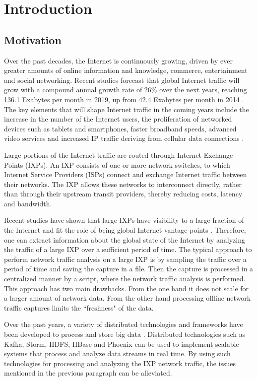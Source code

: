 \chapter{Introduction}\label{chapter:introduction}

\section{Motivation}

Over the past decades, the Internet is continuously growing, driven by ever greater amounts of online information and knowledge, commerce, entertainment and social networking. Recent studies forecast that global Internet traffic will grow with a compound annual growth rate of 26\% over the next years, reaching 136.1 Exabytes per month in 2019, up from 42.4 Exabytes per month in 2014 \cite{cisco_2014}. The key elements that will shape Internet traffic in the coming years include the increase in the number of the Internet users, the proliferation of networked devices such as tablets and smartphones, faster broadband speeds, advanced video services and increased IP traffic deriving from cellular data connections \cite{cisco_press}.

Large portions of the Internet traffic are routed through Internet Exchange Points (IXPs). An IXP consists of one or more network switches, to which Internet Service Providers (ISPs) connect and exchange Internet traffic between their networks. The IXP allows these networks to interconnect directly, rather than through their upstream transit providers, thereby reducing costs, latency and bandwidth. 

Recent studies have shown that large IXPs have visibility to a large fraction of the Internet and fit the role of being global Internet vantage points \cite{smaragdakis}. Therefore, one can extract information about the global state of the Internet by analyzing the traffic of a large IXP over a sufficient period of time. The typical approach to perform network traffic analysis on a large IXP is by sampling the traffic over a period of time and saving the capture in a file. Then the capture is processed in a centralized manner by a script, where the network traffic analysis is performed. This approach has two main drawbacks. From the one hand it does not scale for a larger amount of network data. From the other hand processing offline network traffic captures limits the ``freshness" of the data.

Over the past years, a variety of distributed technologies and frameworks have been developed to process and store big data \cite{hadoop,storm,hbase}. Distributed technologies such as Kafka, Storm, HDFS, HBase and Phoenix can be used to implement scalable systems that process and analyze data streams in real time. By using such technologies for processing and analyzing the IXP network traffic, the issues mentioned in the previous paragraph can be alleviated. 


